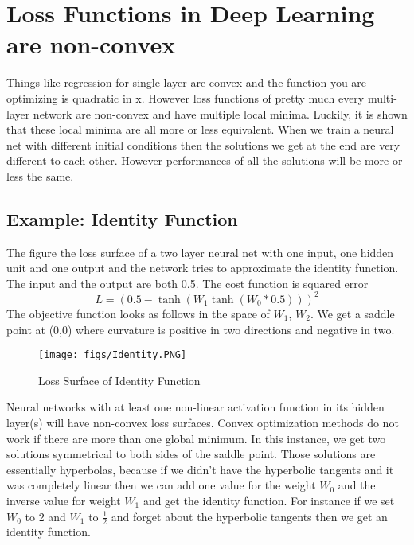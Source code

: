 \chapter{Loss Functions in Deep Learning are non-convex}\label{chp:Loss Functions in Deep Learning are non-convex}

Things like regression for single layer are convex and the function you are optimizing is quadratic in x. However
loss functions of pretty much every multi-layer network are non-convex and have multiple local minima.
Luckily, it is shown that these local minima are all more or less equivalent. 
When we train a neural net with different initial conditions then the solutions we get at the end are very different to each other. 
However performances of all the solutions will be more or less the same. 

\section{Example: Identity Function}
The figure the loss surface of a two layer neural net with one input, one hidden unit and one output and the network tries to approximate the identity function. 
The input and the output are both 0.5. The cost function is squared error 
\begin{equation}
    L = (0.5 - \tanh (W_1 \tanh (W_0 * 0.5)))^2
\end{equation}
The objective function looks as follows in the space of $W_1$, $W_2$. 
We get a saddle point at (0,0) where curvature is positive in two directions and negative in two.\\

\begin{figure}[ht]
\centering
\texttt{[image: figs/Identity.PNG]}
\caption{Loss Surface of Identity Function}
\label{fig:idfn}
\end{figure}

Neural networks with at least one non-linear activation function in its hidden layer(s) will have non-convex loss surfaces. 
Convex optimization methods do not work if there are more than one global minimum. 
In this instance, we get two solutions symmetrical to both sides of the saddle point. 
Those solutions are essentially hyperbolas, because if we didn't have the hyperbolic tangents and it was completely linear then we can add one value for the weight $W_0$ and the inverse value for weight $W_1$ and get the identity function. 
For instance if we set $W_0$ to 2 and $W_1$ to $\frac{1}{2}$ and forget about the hyperbolic tangents then we get an identity function.\\

